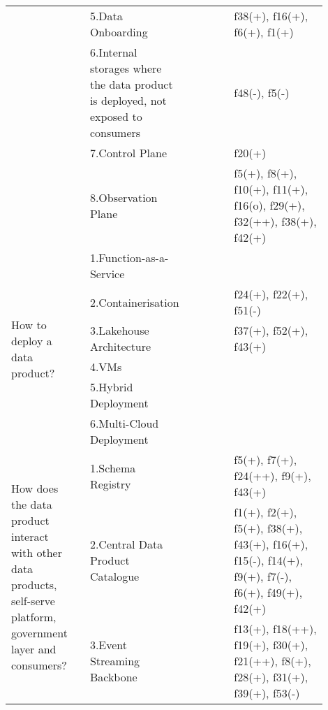 \begin{tabular}{|p{0.12\linewidth}|p{0.015\linewidth}|p{0.3\linewidth}|p{0.15\linewidth}|p{0.31\linewidth}|}
 & \cellcolor{emerald_shape_6}{} & 5.Data Onboarding&\cellcolor{emerald_shape_3}{s4, s5, s15, s30, s52, i1, i3} & f38(+), f16(+), f6(+), f1(+)\\
 & \cellcolor{emerald_shape_6}{} & 6.Internal storages where the data product is deployed, not exposed to consumers&\cellcolor{emerald_shape_4}{s4, s13, s15, s32, s33, s36, s49, i1, i4} & f48(-), f5(-)\\
 & \cellcolor{emerald_shape_6}{} & 7.Control Plane&\cellcolor{emerald_shape_2}{s49, s52, i1, i3} & f20(+)\\
 & \multirow{-8}{\linewidth}{ \cellcolor{emerald_shape_6}{43}} &8.Observation Plane&\cellcolor{emerald_shape_3}{s3, s7, s11, s13, s22, s52, i3} & f5(+), f8(+), f10(+), f11(+), f16(o), f29(+), f32(++), f38(+), f42(+)\\
\multirow{6}{\linewidth}{How to deploy a data product?} &\cellcolor{emerald_shape_4}{} &1.Function-as-a-Service&\cellcolor{emerald_shape_5}{s15, s21, s30, s31, s32, s33, s35, s36} & \\
 & \cellcolor{emerald_shape_4}{} & 2.Containerisation&\cellcolor{emerald_shape_6}{s14, s15, s30, s32, s33, s45, s47, i3, i4, i6} & f24(+), f22(+), f51(-)\\
 & \cellcolor{emerald_shape_4}{} & 3.Lakehouse Architecture&\cellcolor{emerald_shape_3}{i5, i6} & f37(+), f52(+), f43(+)\\
 & \cellcolor{emerald_shape_4}{} & 4.VMs&\cellcolor{emerald_shape_3}{i3, i4} & \\
 & \cellcolor{emerald_shape_4}{} & 5.Hybrid Deployment&\cellcolor{emerald_shape_1}{} & \\
 & \multirow{-6}{\linewidth}{ \cellcolor{emerald_shape_4}{17}} &6.Multi-Cloud Deployment&\cellcolor{emerald_shape_1}{} & \\
\multirow{8}{\linewidth}{How does the data product interact with other data products, self-serve platform, government layer and consumers?} &\cellcolor{emerald_shape_7}{} &1.Schema Registry&\cellcolor{emerald_shape_4}{s3, s6, s7, s15, s16, s17, s19, s20, s24, s41, s47, s48, s54, s57, i3, i5, i6} & f5(+), f7(+), f24(++), f9(+), f43(+)\\
 & \cellcolor{emerald_shape_7}{} & 2.Central Data Product Catalogue&\cellcolor{emerald_shape_5}{s5, s9, s15, s20, s23, s31, s32, s39, s40, s42, s45, s46, s47, s48, s49, s53, s54, s55, i1, i3} & f1(+), f2(+), f5(+), f38(+), f43(+), f16(+), f15(-), f14(+), f9(+), f7(-), f6(+), f49(+), f42(+)\\
 & \cellcolor{emerald_shape_7}{} & 3.Event Streaming Backbone&\cellcolor{emerald_shape_5}{s4, s9, s17, s20, s26, s33, s34, s36, s38, s41, s44, s45, s48, s51, s52, s53, s55, s56, s57, i1, i2, i3, i5, i6} & f13(+), f18(++), f19(+), f30(+), f21(++), f8(+), f28(+), f31(+), f39(+), f53(-)\\

\end{tabular}
